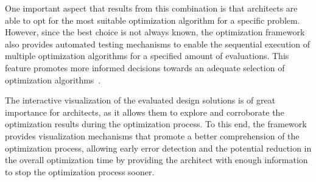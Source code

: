 One important aspect that results from this combination is that architects are able to opt for the most suitable optimization algorithm for a specific problem. However, since the best choice is not always known, the optimization framework also provides automated testing mechanisms to enable the sequential execution of multiple optimization algorithms for a specified amount of evaluations. This feature promotes more informed decisions towards an adequate selection of optimization algorithms~\cite{Wortmann2016BBO}.

The interactive visualization of the evaluated design solutions is of great importance for architects, as it allows them to explore and corroborate the optimization results during the optimization process. To this end, the framework provides visualization mechanisms that promote a better comprehension of the optimization process, allowing early error detection and the potential reduction in the overall optimization time by providing the architect with enough information to stop the optimization process sooner. 

